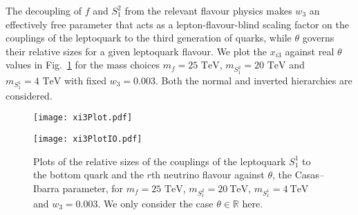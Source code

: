 The decoupling of $f$ and $S_{1}^{2}$ from the relevant flavour physics makes
$w_3$ an effectively free parameter that acts as a lepton-flavour-blind scaling
factor on the couplings of the leptoquark to the third generation of quarks,
while $\theta$ governs their relative sizes for a given leptoquark flavour. We
plot the $x_{i3}$ against real $\theta$ values in Fig.~\ref{fig:ch4-xi3plot} for
the mass choices $m_f = 25 \text{ TeV}$, $m_{S_{1}^{2}} = 20 \text{ TeV}$ and
$m_{S_{1}^{1}} = 4 \text{ TeV}$ with fixed $w_3 = 0.003$. Both the normal and
inverted hierarchies are considered.

\begin{figure}[t]
  \centering%
  \begin{minipage}[t]{0.45\linewidth}
    \centering \texttt{[image: xi3Plot.pdf]}
    \label{fig:noxi3plot}
  \end{minipage}
  \hfill
  \begin{minipage}[t]{0.45\linewidth}
    \centering \texttt{[image: xi3PlotIO.pdf]}
    \label{fig:ioxi3plot}
  \end{minipage}
  \caption{Plots of the relative sizes of the couplings of the leptoquark
    $S_{1}^{1}$ to the bottom quark and the $r$th neutrino flavour against
    $\theta$, the Casas--Ibarra parameter, for $m_f = 25 \text{ TeV}$,
    $m_{S_{1}^{2}} = \SI{20}{\TeV}$, $m_{S_{1}^{1}} = \SI{4}{\TeV}$ and
    $w_3 = 0.003$. We only consider the case $\theta \in \mathbb{R}$ here.}
  \label{fig:ch4-xi3plot}
\end{figure}

